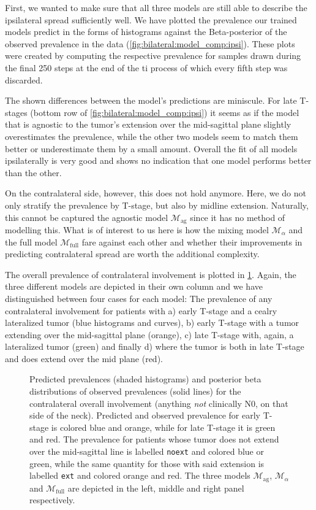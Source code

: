 \documentclass[\relativeRoot/main.tex]{subfiles}
\begin{document}
First, we wanted to make sure that all three models are still able to describe the ipsilateral spread sufficiently well. We have plotted the prevalence our trained models predict in the forms of histograms against the Beta-posterior of the observed prevalence in the data (\cref{fig:bilateral:model_comp:ipsi}). These plots were created by computing the respective prevalence for samples drawn during the final 250 steps at the end of the \gls{ti} process of which every fifth step was discarded.

The shown differences between the model's predictions are miniscule. For late T-stages (bottom row of \cref{fig:bilateral:model_comp:ipsi}) it seems as if the model that is agnostic to the tumor's extension over the mid-sagittal plane slightly overestimates the prevalence, while the other two models seem to match them better or underestimate them by a small amount. Overall the fit of all models ipsilaterally is very good and shows no indication that one model performs better than the other.

On the contralateral side, however, this does not hold anymore. Here, we do not only stratify the prevalence by T-stage, but also by midline extension. Naturally, this cannot be captured the agnostic model $\mathcal{M}_\text{ag}$ since it has no method of modelling this. What is of interest to us here is how the mixing model $\mathcal{M}_\alpha$ and the full model $\mathcal{M}_\text{full}$ fare against each other and whether their improvements in predicting contralateral spread are worth the additional complexity.

The overall prevalence of contralateral involvement is plotted in \cref{fig:bilateral:model_comp:contra}. Again, the three different models are depicted in their own column and we have distinguished between four cases for each model: The prevalence of any contralateral involvement for patients with a) early T-stage and a cealry lateralized tumor (blue histograms and curves), b) early T-stage with a tumor extending over the mid-sagittal plane (orange), c) late T-stage with, again, a lateralized tumor (green) and finally d) where the tumor is both in late T-stage and does extend over the mid plane (red).

\begin{figure}
    \def\svgwidth{1.0\textwidth}
    
    \caption{
        Predicted prevalences (shaded histograms) and posterior beta distributions of observed prevalences (solid lines) for the contralateral overall involvement (anything \emph{not} clinically N0, on that side of the neck). Predicted and observed prevalence for early T-stage is colored blue and orange, while for late T-stage it is green and red. The prevalence for patients whose tumor does not extend over the mid-sagittal line is labelled \texttt{noext} and colored blue or green, while the same quantity for those with said extension is labelled \texttt{ext} and colored orange and red. The three models $\mathcal{M}_\text{ag}$, $\mathcal{M}_\alpha$ and $\mathcal{M}_\text{full}$ are depicted in the left, middle and right panel respectively.
    }
    \label{fig:bilateral:model_comp:contra}
\end{figure}
\end{document}
